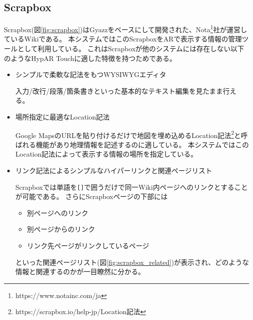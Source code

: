 \subsection{Scrapbox}
Scrapbox(図\ref{fig:scrapbox})はGyazz\cite{Gyazz}をベースにして開発された、Nota\footnote{\textsf{https://www.notainc.com/ja}}社が運営しているWikiである。
本システムではこのScrapboxをARで表示する情報の管理ツールとして利用している。
これはScrapboxが他のシステムには存在しない以下のようなHypAR Touchに適した特徴を持つためである。
\begin{itemize}
  \item シンプルで柔軟な記法をもつWYSIWYGエディタ
  
  入力/改行/段落/箇条書きといった基本的なテキスト編集を見たまま行える。
  
  \item 場所指定に最適なLocation記法
  
  Google MapsのURLを貼り付けるだけで地図を埋め込めるLocation記法\footnote{\textsf{https://scrapbox.io/help-jp/Location記法}}と呼ばれる機能があり地理情報を記述するのに適している。
  本システムではこのLocation記法によって表示する情報の場所を指定している。

  \item リンク記法によるシンプルなハイパーリンクと関連ページリスト
  
  Scrapboxでは単語を\texttt{[]}で囲うだけで同一Wiki内ページへのリンクとすることが可能である。
  さらにScrapboxページの下部には
  \begin{itemize}
      \item 別ページへのリンク
      \item 別ページからのリンク
      \item リンク先ページがリンクしているページ
  \end{itemize}
  といった関連ページリスト(図\ref{fig:scrapbox_related})が表示され、どのような情報と関連するのかが一目瞭然に分かる。
\end{itemize}

